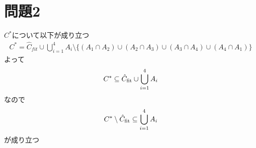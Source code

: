 \section*{問題2}
\noindent
$C^*$について以下が成り立つ
\begin{eqnarray*}
    C^*=\hat{C}_{fit}\cup \bigcup_{i=1}^{4}{A_i}\setminus\{(A_1\cap{A_2})\cup(A_2\cap{A_3})\cup(A_3\cap{A_4})\cup(A_4\cap{A_1})\}
\end{eqnarray*}
よって
\begin{eqnarray*}
    C^*\subseteq\hat{C}_{\rm fit}\cup \bigcup_{i=1}^{4}{A_i}
\end{eqnarray*}
なので
\begin{eqnarray*}
    C^*\setminus\hat{C}_{\rm fit}\subseteq\bigcup_{i=1}^{4}{A_i}
\end{eqnarray*}
が成り立つ
